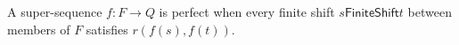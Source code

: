 \begin{definition}
A super-sequence $f:F\to Q$ is perfect when every finite shift
$s\mathrel{\mathsf{FiniteShift}}t$ between members of $F$ satisfies
\(r(f(s),f(t))\).
\end{definition}
